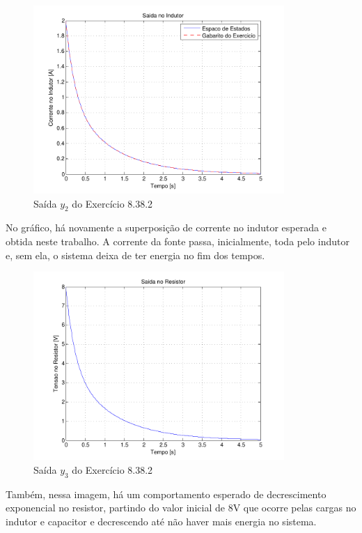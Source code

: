 \documentclass{report}
\begin{document}
\clearpage
\begin{figure}[h!]
    \centering
    \includegraphics[width=0.85\textwidth]{images/plots/plot_8_38_2_y2.pdf}
    \caption{\label{plot:8.38.2_y2} Saída $ y_2 $ do Exercício 8.38.2}
\end{figure}

No gráfico, há novamente a superposição de corrente no indutor esperada e obtida neste trabalho.
A corrente da fonte passa, inicialmente, toda pelo indutor e, sem ela, o sistema deixa de ter energia no
fim dos tempos.

\begin{figure}[h!]
    \centering
    \includegraphics[width=0.85\textwidth]{images/plots/plot_8_38_2_y3.pdf}
    \caption{\label{plot:8.38.2_y3} Saída $ y_3 $ do Exercício 8.38.2}
\end{figure}

Também, nessa imagem, há um comportamento esperado de decrescimento exponencial no resistor, partindo do valor inicial de $ 8\text{V} $
que ocorre pelas cargas no indutor e capacitor e decrescendo até não haver mais energia no sistema.
\end{document}
